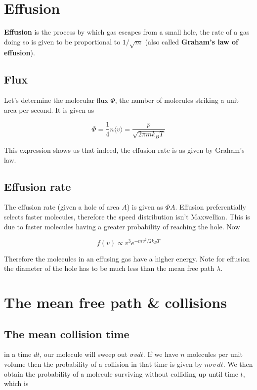 \documentclass[a4paper]{article}
\begin{document}
\section{Effusion}

\textbf{Effusion} is the process by which gas escapes from a small hole, the rate of a gas doing so is given to be proportional to $1/\sqrt{m}$ (also called \textbf{Graham's law of effusion}).

\subsection{Flux}

Let's determine the molecular flux $\Phi$, the number of molecules striking a unit area per second. It is given as

\begin{equation}
	\Phi=\frac{1}{4}n\langle v\rangle=\frac{p}{\sqrt{2\pi mk_BT}}
\end{equation}

This expression shows us that indeed, the effusion rate is as given by Graham's law.

\subsection{Effusion rate}

The effusion rate (given a hole of area $A$) is given as $\Phi A$. Effusion preferentially selects faster molecules, therefore the speed distribution isn't Maxwellian. This is due to faster molecules having a greater probability of reaching the hole. Now

\begin{equation}
	f(v)\propto v^3 e^{-mv^2/2k_BT}
\end{equation}

Therefore the molecules in an effusing gas have a higher energy. Note for effusion the diameter of the hole has to be much less than the mean free path $\lambda$.

\section{The mean free path \& collisions}

\subsection{The mean collision time}

in a time $dt$, our molecule will sweep out $\sigma v dt$. If we have $n$ molecules per unit volume then the probability of a collision in that time is given by $n\sigma v\,dt$. We then obtain the probability of a molecule surviving without colliding up until time $t$, which is
\end{document}
